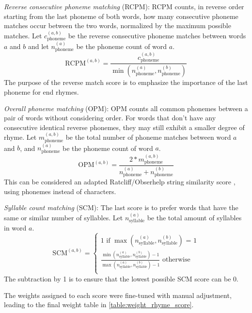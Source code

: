 \documentclass[11pt,a4paper]{article}
\newenvironment{tight_itemize}{
\begin{itemize}
\setlength{\itemsep}{0pt}
\setlength{\parskip}{0pt}
}{\end{itemize}}
\begin{document}
\begin{tight_itemize}
	\vspace{-0.5em}
	\item \textit{Reverse consecutive phoneme matching} (RCPM):
	RCPM counts, in reverse order starting from the last phoneme of both words, how many consecutive phoneme matches occur between the two words, normalized by the maximum possible matches. Let $c^{(a,b)}_{\text{phoneme}}$ be the reverse consecutive phoneme matches between words $a$ and $b$ and let $n^{(a)}_{\text{phoneme}}$ be the phoneme count of word $a$.
	$$\textrm{RCPM}^{(a,b)} = \frac{c^{(a,b)}_{\text{phoneme}}}{\min(n^{(a)}_{\text{phoneme}}, n^{(b)}_{\text{phoneme}})}$$
	The purpose of the reverse match score is to emphasize the importance of the last phoneme for end rhymes.
	\item \textit{Overall phoneme matching} (OPM):
		OPM counts all common phonemes between a pair of words without considering order. For words that don't have any consecutive identical reverse phonemes, they may still exhibit a smaller degree of rhyme. Let $m^{(a,b)}_{\text{phoneme}}$ be the total number of phoneme matches between word $a$ and $b$, and $n^{(a)}_{\text{phoneme}}$ be the phoneme count of word $a$.
		$$\textrm{OPM}^{(a,b)} = \frac{2 * m^{(a,b)}_{\text{phoneme}}}{n^{(a)}_{\text{phoneme}} + n^{(b)}_{\text{phoneme}}}$$
		This can be considered an adapted Ratcliff/Obserhelp string similarity score \cite{ratcliff}, using phonemes instead of characters.
	\item \textit{Syllable count matching} (SCM):
	The last score is to prefer words that have the same or similar number of syllables. Let $n^{(a)}_{\text{syllable}}$ be the total amount of syllables in word $a$.
	\begin{equation}
	\textrm{SCM}^{(a,b)} = 
	\begin{cases}
	\nonumber 1 \text{ if $\max(n^{(a)}_{\text{syllable}}, n^{(b)}_{\text{syllable}})$ = 1}\\
	\nonumber \frac{\min(n^{(a)}_{\text{syllable}}, n^{(b)}_{\text{syllable}}) - 1}{\max(n^{(a)}_{\text{syllable}}, n^{(b)}_{\text{syllable}}) - 1} \text{ otherwise}\\
        \end{cases}
	\end{equation}
	The subtraction by 1 is to ensure that the lowest possible SCM score can be 0.
\end{tight_itemize}

The weights assigned to each score were fine-tuned with manual adjustment, leading to the final weight table in \ref{table:weight_rhyme_score}.
\end{document}
